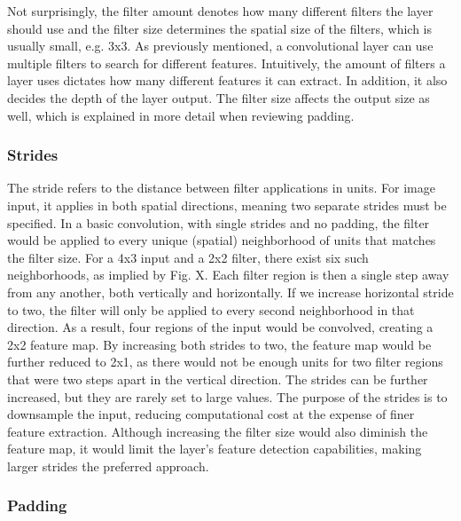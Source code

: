 Not surprisingly, the filter amount denotes how many different filters the layer should use and the filter size determines the spatial size of the filters, which is usually small, e.g. 3x3. As previously mentioned, a convolutional layer can use multiple filters to search for different features. Intuitively, the amount of filters a layer uses dictates how many different features it can extract. In addition, it also decides the depth of the layer output. The filter size affects the output size as well, which is explained in more detail when reviewing padding.

\subsubsection{Strides}

The stride refers to the distance between filter applications in units. For image input, it applies in both spatial directions, meaning two separate strides must be specified. In a basic convolution, with single strides and no padding, the filter would be applied to every unique (spatial) neighborhood of units that matches the filter size. For a 4x3 input and a 2x2 filter, there exist six such neighborhoods, as implied by Fig. X. Each filter region is then a single step away from any another, both vertically and horizontally. If we increase horizontal stride to two, the filter will only be applied to every second neighborhood in that direction. As a result, four regions of the input would be convolved, creating a 2x2 feature map. By increasing both strides to two, the feature map would be further reduced to 2x1, as there would not be enough units for two filter regions that were two steps apart in the vertical direction. The strides can be further increased, but they are rarely set to large values. The purpose of the strides is to downsample the input, reducing computational cost at the expense of finer feature extraction. Although increasing the filter size would also diminish the feature map, it would limit the layer's feature detection capabilities, making larger strides the preferred approach.

\subsubsection{Padding}

